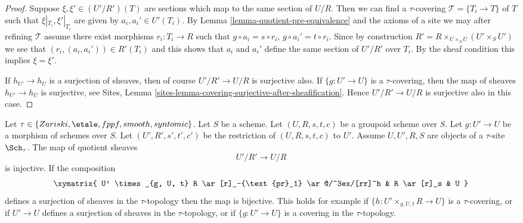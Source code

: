 \begin{proof}
Suppose $\xi, \xi' \in (U'/R')(T)$ are sections which
map to the same section of $U/R$.
Then we can find a $\tau$-covering $\mathcal{T} = \{T_i \to T\}$ of $T$
such that $\xi|_{T_i}, \xi'|_{T_i}$ are given by $a_i, a_i' \in U'(T_i)$. By
Lemma \ref{lemma-quotient-pre-equivalence}
and the axioms of a site we may after refining
$\mathcal{T}$ assume there exist morphisms $r_i : T_i \to R$
such that $g \circ a_i = s \circ r_i$, $g \circ a_i' = t \circ r_i$.
Since by construction
$R' = R \times_{U \times_S U} (U' \times_S U')$
we see that $(r_i, (a_i, a_i')) \in R'(T_i)$ and this
shows that $a_i$ and $a_i'$ define the same section
of $U'/R'$ over $T_i$. By the sheaf condition this implies
$\xi = \xi'$.

\medskip\noindent
If $h_{U'} \to h_U$ is a surjection
of sheaves, then of course $U'/R' \to U/R$ is surjective also.
If $\{g : U' \to U\}$ is a $\tau$-covering, then
the map of sheaves $h_{U'} \to h_U$ is surjective, see
Sites, Lemma \ref{sites-lemma-covering-surjective-after-sheafification}.
Hence $U'/R' \to U/R$ is surjective also in this case.
\end{proof}

\begin{lemma}
\label{lemma-quotient-groupoid-restrict}
Let $\tau \in \{Zariski, \etale, fppf, smooth, syntomic\}$.
Let $S$ be a scheme.
Let $(U, R, s, t, c)$ be a groupoid scheme over $S$.
Let $g : U' \to U$ be a morphism of schemes over $S$.
Let $(U', R', s', t', c')$ be the restriction of $(U, R, s, t, c)$ to $U'$.
Assume  $U, U', R, S$ are objects of a $\tau$-site $\Sch_\tau$.
The map of quotient sheaves
$$
U'/R' \longrightarrow U/R
$$
is injective. If the composition
$$
\xymatrix{
U' \times_{g, U, t} R \ar[r]_-{\text{pr}_1} \ar@/^3ex/[rr]^h
& R \ar[r]_s & U
}
$$
defines a surjection of sheaves in the $\tau$-topology  then
the map is bijective. This holds for example if
$\{h : U' \times_{g, U, t} R \to U\}$ is a $\tau$-covering, or
if $U' \to U$ defines a surjection of sheaves in the $\tau$-topology, or if
$\{g : U' \to U\}$ is a covering in the $\tau$-topology.
\end{lemma}

